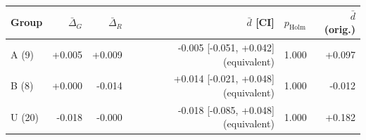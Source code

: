 \begin{tabular}{@{}lrrrlr@{}}
\toprule
Group & $\bar\Delta_G$ & $\bar\Delta_R$ & $\bar d$ [CI] & $p_{\mathrm{Holm}}$ & $\bar d$ (orig.) \\
\midrule
A (9) & +0.005 & +0.009 & -0.005 [-0.051, +0.042] (equivalent) & 1.000 & +0.097 \\
B (8) & +0.000 & -0.014 & +0.014 [-0.021, +0.048] (equivalent) & 1.000 & -0.012 \\
U (20) & -0.018 & -0.000 & -0.018 [-0.085, +0.048] (equivalent) & 1.000 & +0.182 \\
\bottomrule
\end{tabular}
